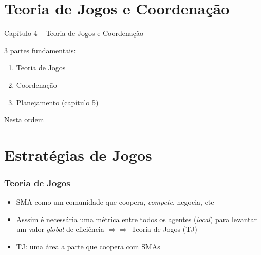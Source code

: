 
\section{Teoria de Jogos e Coordenação}
\begin{frame}

\begin{center}
{\huge Capítulo 4 -- Teoria de Jogos e  Coordenação}

3 partes fundamentais:

\begin{enumerate}
  \item Teoria de Jogos
  \item Coordenação
  \item Planejamento (capítulo 5)
\end{enumerate}
Nesta ordem
\end{center}

\end{frame}





\section{Estratégias de Jogos}
\begin{frame}

    \frametitle{Teoria de Jogos}
    \begin{itemize}
    \pause
      \item SMA como um comunidade que coopera, \textit{compete},  negocia, etc
      \pause
      \item Asssim é necessária uma métrica 
      entre todos os agentes (\textit{local})
        para levantar um valor \textit{global} de eficiência $\Rightarrow \Rightarrow $ Teoria de Jogos (TJ)
        
        \pause
      \item TJ: uma área a parte que coopera com SMAs
    
    \end{itemize}
\end{frame}


